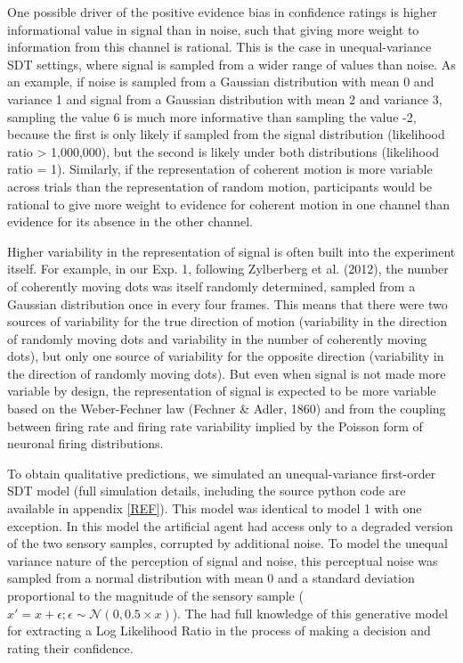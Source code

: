 \documentclass[12pt,twoside]{reedthesis}
\begin{document}
One possible driver of the positive evidence bias in confidence ratings is higher informational value in signal than in noise, such that giving more weight to information from this channel is rational. This is the case in unequal-variance SDT settings, where signal is sampled from a wider range of values than noise. As an example, if noise is sampled from a Gaussian distribution with mean 0 and variance 1 and signal from a Gaussian distribution with mean 2 and variance 3, sampling the value 6 is much more informative than sampling the value -2, because the first is only likely if sampled from the signal distribution (likelihood ratio \textgreater{} 1,000,000), but the second is likely under both distributions (likelihood ratio = 1). Similarly, if the representation of coherent motion is more variable across trials than the representation of random motion, participants would be rational to give more weight to evidence for coherent motion in one channel than evidence for its absence in the other channel.

Higher variability in the representation of signal is often built into the experiment itself. For example, in our Exp. 1, following Zylberberg et al. (2012), the number of coherently moving dots was itself randomly determined, sampled from a Gaussian distribution once in every four frames. This means that there were two sources of variability for the true direction of motion (variability in the direction of randomly moving dots and variability in the number of coherently moving dots), but only one source of variability for the opposite direction (variability in the direction of randomly moving dots). But even when signal is not made more variable by design, the representation of signal is expected to be more variable based on the Weber-Fechner law (Fechner \& Adler, 1860) and from the coupling between firing rate and firing rate variability implied by the Poisson form of neuronal firing distributions.

To obtain qualitative predictions, we simulated an unequal-variance first-order SDT model (full simulation details, including the source python code are available in appendix \ref{REF}). This model was identical to model 1 with one exception. In this model the artificial agent had access only to a degraded version of the two sensory samples, corrupted by additional noise. To model the unequal variance nature of the perception of signal and noise, this perceptual noise was sampled from a normal distribution with mean 0 and a standard deviation proportional to the magnitude of the sensory sample (\(x'=x+\epsilon; \epsilon \sim \mathcal{N}(0,0.5\times x)\)). The had full knowledge of this generative model for extracting a Log Likelihood Ratio in the process of making a decision and rating their confidence.
\end{document}
